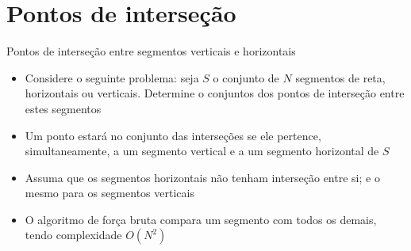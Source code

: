 \section{Pontos de interseção}

\begin{frame}[fragile]{Pontos de interseção entre segmentos verticais e horizontais}

    \begin{itemize}
        \item Considere o seguinte problema: seja $S$ o conjunto de $N$ segmentos de reta, 
            horizontais ou verticais. Determine o conjuntos dos pontos de interseção
            entre estes segmentos
        \pause

        \item Um ponto estará no conjunto das interseções se ele pertence, simultaneamente, a
            um segmento vertical e a um segmento horizontal de $S$
        \pause

        \item Assuma que os segmentos horizontais não tenham interseção entre si; e o mesmo para
            os segmentos verticais
        \pause

        \item O algoritmo de força bruta compara um segmento com todos os demais, tendo
            complexidade $O(N^2)$
    \end{itemize}

\end{frame}




